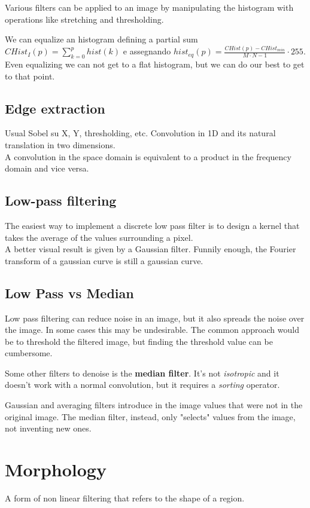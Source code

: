 \documentclass{article}
\begin{document}
Various filters can be applied to an image by manipulating the histogram with operations like stretching and thresholding.

We can equalize an histogram defining a partial sum $CHist_I(p) = \sum_{k=0}^p hist(k)$ e assegnando $hist_{eq}(p) = \frac{CHist(p) - CHist_{min}}{M\cdot N -1} \cdot 255$.\\
Even equalizing we can not get to a flat histogram, but we can do our best to get to that point.

\subsection*{Edge extraction} Usual Sobel su X, Y, thresholding, etc. Convolution in 1D and its natural translation in two dimensions.\\
A convolution in the space domain is equivalent to a product in the frequency domain and vice versa.

\subsection*{Low-pass filtering}
The easiest way to implement a discrete low pass filter is to design a kernel that takes the average of the values surrounding a pixel.\\
A better visual result is given by a Gaussian filter. Funnily enough, the Fourier transform of a gaussian curve is still a gaussian curve.

\subsection*{Low Pass vs Median}
Low pass filtering can reduce noise in an image, but it also spreads the noise over the image. In some cases this may be undesirable. The common approach would be to threshold the filtered image, but finding the threshold value can be cumbersome.

Some other filters to denoise is the \textbf{median filter}. It's not \textit{isotropic} and it doesn't work with a normal convolution, but it requires a \textit{sorting} operator.

Gaussian and averaging filters introduce in the image values that were not in the original image. The median filter, instead, only "selects" values from the image, not inventing new ones.

\section{Morphology}
A form of non linear filtering that refers to the shape of a region.
\end{document}

